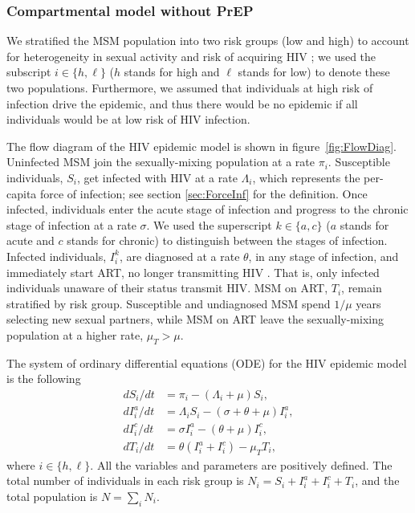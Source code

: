 \documentclass[11pt]{article}
\begin{document}
\subsubsection{Compartmental model without PrEP}

We stratified the MSM population into two risk groups (low and high) to account for heterogeneity in sexual activity and risk of acquiring HIV \cite{Jacquez1989}; we used the subscript $i\in\{h,\ell\}$ ($h$ stands for high and $\ell$ stands for low) to denote these two populations. Furthermore, we assumed that individuals at high risk of infection drive the epidemic, and thus there would be no epidemic if all individuals would be at low risk of HIV infection. 
		
The flow diagram of the HIV epidemic model is shown in figure~\ref{fig:FlowDiag}. Uninfected MSM join the sexually-mixing population at a rate $\pi_i$. Susceptible individuals, $S_i$, get infected with HIV at a rate $\Lambda_i$, which represents the per-capita force of infection; see section \ref{sec:ForceInf} for the definition. Once infected, individuals enter the acute stage of infection and progress to the chronic stage of infection at a rate $\sigma$. We used the superscript $k\in \{a,c\}$ ($a$ stands for acute and $c$ stands for chronic) to distinguish between the stages of infection. Infected individuals, $I_i^k$, are diagnosed at a rate $\theta$, in any stage of infection, and immediately start ART, no longer transmitting HIV \cite{Rodger2016}. That is, only infected individuals unaware of their status transmit HIV. MSM on ART, $T_i$, remain stratified by risk group. Susceptible and undiagnosed MSM spend $1/\mu$ years selecting new sexual partners, while MSM on ART leave the sexually-mixing population at a higher rate, $\mu_T > \mu$. 

The system of ordinary differential equations (ODE) for the HIV epidemic model is the following
\begin{equation} \label{eq:ODEsys}
\begin{aligned}
        dS_i/dt 		& = \pi_i - \left( \Lambda_i + \mu \right) S_i, \\ 
        dI_i^a/dt 		& = \Lambda_i S_i - \left( \sigma + \theta + \mu \right) I_i^a, \\
        dI_i^c/dt 		& = \sigma I_i^a - (\theta +\mu) I_i^c, \\
        dT_i/dt 		& = \theta \left(I_i^a + I_i^c \right) - \mu_T T_i,
\end{aligned}
\end{equation}
where $i \in\{h,\ell\}$. All the variables and parameters are positively defined. The total number of individuals in each risk group is $N_i = S_i + I_i^a + I_i^c + T_i$, and the total population is $N = \sum_i N_i$. 
\end{document}
